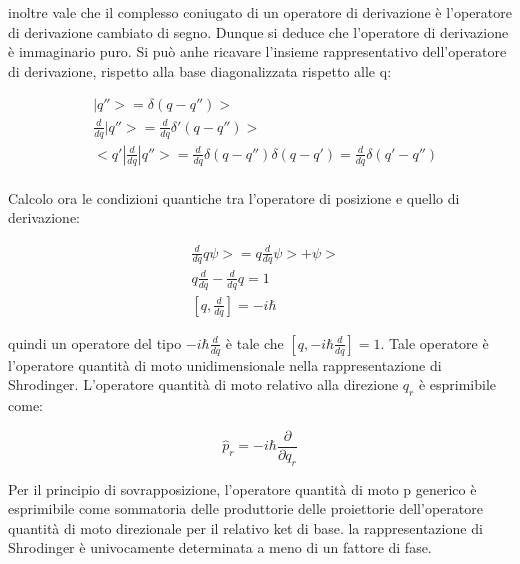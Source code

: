 \documentclass{article}
\begin{document}
inoltre vale che il complesso coniugato di un operatore di derivazione è l'operatore di derivazione cambiato di segno.
Dunque si deduce che l'operatore di derivazione è immaginario puro.
Si può anhe ricavare l'insieme rappresentativo dell'operatore di derivazione, rispetto alla base diagonalizzata rispetto alle q:

\begin{equation}
    \begin{aligned}
         & |q''>= \delta(q-q'')>                                                                     \\
         & \frac{d}{dq}|q''>= \frac{d}{dq}\delta'(q-q'')>                                            \\
         & <q'|\frac{d}{dq}|q''>= \frac{d}{dq}\delta(q-q'')\delta(q-q')= \frac{d}{dq} \delta(q'-q'') \\
    \end{aligned}
\end{equation}

Calcolo ora le condizioni quantiche tra l'operatore di posizione e quello di derivazione:

\begin{equation}
    \begin{aligned}
         & \frac{d}{dq} q\psi>= q\frac{d}{dq}\psi> + \psi> \\
         & q\frac{d}{dq}-\frac{d}{dq}q=1                   \\
         & [q,\frac{d}{dq}]=-i\hbar
    \end{aligned}
\end{equation}

quindi un operatore del tipo $-i\hbar\frac{d}{dq}$ è tale che $[q,-i\hbar\frac{d}{dq}]=1$.
Tale operatore è l'operatore quantità di moto unidimensionale nella rappresentazione di Shrodinger.
L'operatore quantità di moto relativo alla direzione $q_r$ è esprimibile come:

\begin{equation}
    \hat{p}_r = -i\hbar \frac{\partial}{\partial q_r}
\end{equation}

Per il principio di sovrapposizione, l'operatore quantità di moto p generico è esprimibile come sommatoria
delle produttorie delle proiettorie dell'operatore quantità di moto direzionale per il relativo ket di base.
la rappresentazione di Shrodinger è univocamente determinata a meno di un fattore di fase.
\end{document}
